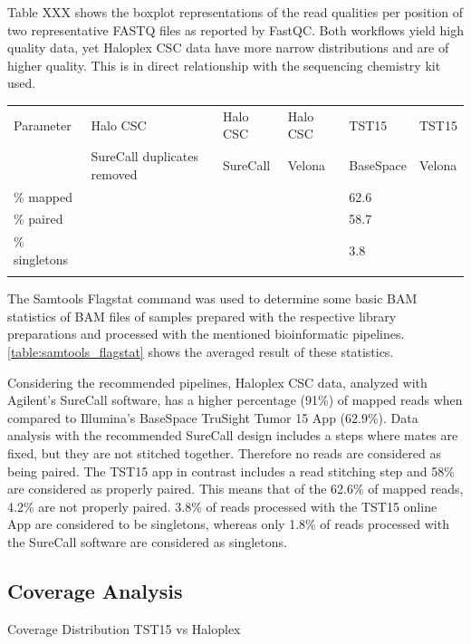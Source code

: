 Table XXX shows the boxplot representations of the read qualities per position
of two representative FASTQ files as reported by FastQC. Both workflows yield high
quality data, yet Haloplex CSC data have more narrow distributions and are of higher
quality. This is in direct relationship with the sequencing chemistry kit used.

\begin{table}
\begin{tabular}{p{3.5cm} p{1cm} p{1cm}}\\
\hline
Parameter & Halo CSC & Halo CSC & Halo CSC & TST15 & TST15 \\
          & SureCall duplicates removed & SureCall & Velona & BaseSpace & Velona \\
\hline
\% mapped & & & & 62.6 & \\
\% paired & & & & 58.7 & \\
\% singletons & & & & 3.8 & \\
\label{samtools_flagstat}
\end{tabular}
\end{table}

The Samtools Flagstat command was used to determine some basic BAM statistics of BAM
files of samples prepared with the respective library preparations and processed with
the mentioned bioinformatic pipelines. \ref{table:samtools_flagstat} shows the
averaged result of these statistics.

Considering the recommended pipelines, Haloplex
CSC data, analyzed with Agilent's SureCall software, has a higher percentage (91\%) of mapped
reads when compared to Illumina's BaseSpace TruSight Tumor 15 App (62.9\%). Data analysis
with the recommended SureCall design includes a steps where mates are fixed, but they
are not stitched together. Therefore no reads are considered as being paired. The TST15 app
in contrast includes a read stitching step and 58\% are considered as properly paired.
This means that of the 62.6\% of mapped reads, 4.2\% are not properly paired. 3.8\%
of reads processed with the TST15 online App are considered to be singletons, whereas
only 1.8\% of reads processed with the SureCall software are considered as singletons.

\subsection{Coverage Analysis}

Coverage Distribution TST15 vs Haloplex

